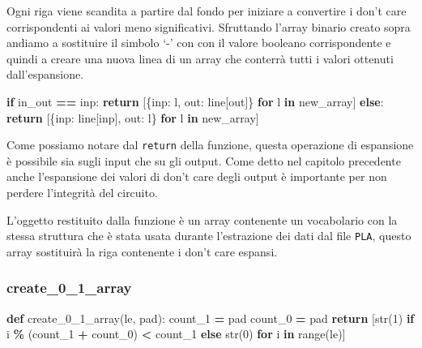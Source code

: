 \documentclass[
]{book}
\newenvironment{Shaded}{\begin{snugshade}}{\end{snugshade}}
\newcommand{\BuiltInTok}[1]{#1}
\newcommand{\ControlFlowTok}[1]{\textcolor[rgb]{0.13,0.29,0.53}{\textbf{#1}}}
\newcommand{\DecValTok}[1]{\textcolor[rgb]{0.00,0.00,0.81}{#1}}
\newcommand{\KeywordTok}[1]{\textcolor[rgb]{0.13,0.29,0.53}{\textbf{#1}}}
\newcommand{\NormalTok}[1]{#1}
\newcommand{\OperatorTok}[1]{\textcolor[rgb]{0.81,0.36,0.00}{\textbf{#1}}}
\newcommand{\StringTok}[1]{\textcolor[rgb]{0.31,0.60,0.02}{#1}}
\begin{document}
Ogni riga viene scandita a partire dal fondo per iniziare a convertire i don't care corrispondenti ai valori meno significativi. Sfruttando l'array binario creato sopra andiamo a sostituire il simbolo `-' con con il valore booleano corrispondente e quindi a creare una nuova linea di un array che conterrà tutti i valori ottenuti dall'espansione.

\newpage

\begin{Shaded}
\begin{Highlighting}[]
\ControlFlowTok{if}\NormalTok{ in\_out }\OperatorTok{==} \StringTok{\textquotesingle{}inp\textquotesingle{}}\NormalTok{:}
  \ControlFlowTok{return}\NormalTok{ [\{}\StringTok{\textquotesingle{}inp\textquotesingle{}}\NormalTok{:  l, }\StringTok{\textquotesingle{}out\textquotesingle{}}\NormalTok{:  line[}\StringTok{\textquotesingle{}out\textquotesingle{}}\NormalTok{]\} }\ControlFlowTok{for}\NormalTok{ l }\KeywordTok{in}\NormalTok{ new\_array]}
\ControlFlowTok{else}\NormalTok{:}
  \ControlFlowTok{return}\NormalTok{ [\{}\StringTok{\textquotesingle{}inp\textquotesingle{}}\NormalTok{:  line[}\StringTok{\textquotesingle{}inp\textquotesingle{}}\NormalTok{], }\StringTok{\textquotesingle{}out\textquotesingle{}}\NormalTok{:  l\} }\ControlFlowTok{for}\NormalTok{ l }\KeywordTok{in}\NormalTok{ new\_array]}
\end{Highlighting}
\end{Shaded}

Come possiamo notare dal \texttt{return} della funzione, questa operazione di espansione è possibile sia sugli input che su gli output. Come detto nel capitolo precedente anche l'espansione dei valori di don't care degli output è importante per non perdere l'integrità del circuito.

L'oggetto restituito dalla funzione è un array contenente un vocabolario con la stessa struttura che è stata usata durante l'estrazione dei dati dal file \texttt{PLA}, questo array sostituirà la riga contenente i don't care espansi.

\hypertarget{create_0_1_array}{%
\subsubsection{create\_0\_1\_array}\label{create_0_1_array}}

\begin{Shaded}
\begin{Highlighting}[]
\KeywordTok{def}\NormalTok{ create\_0\_1\_array(le, pad):}
\NormalTok{  count\_1 }\OperatorTok{=}\NormalTok{ pad}
\NormalTok{  count\_0 }\OperatorTok{=}\NormalTok{ pad}
  \ControlFlowTok{return}\NormalTok{ [}\BuiltInTok{str}\NormalTok{(}\DecValTok{1}\NormalTok{) }\ControlFlowTok{if}\NormalTok{ i }\OperatorTok{\%}\NormalTok{ (count\_1 }\OperatorTok{+}\NormalTok{ count\_0) }\OperatorTok{\textless{}}\NormalTok{ count\_1 }
    \ControlFlowTok{else} \BuiltInTok{str}\NormalTok{(}\DecValTok{0}\NormalTok{) }\ControlFlowTok{for}\NormalTok{ i }\KeywordTok{in} \BuiltInTok{range}\NormalTok{(le)]}
\end{Highlighting}
\end{Shaded}
\end{document}
